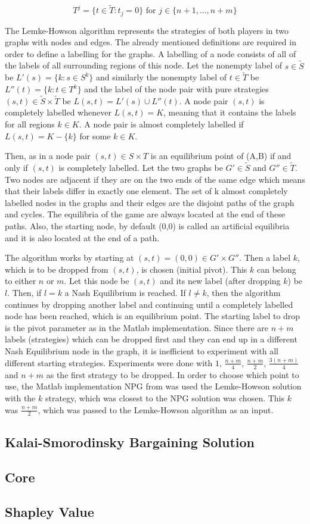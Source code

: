 \[
T^j = \{ t \in \tilde{T}: t_j = 0 \} \text{ for } j \in \{n+1,...,n+m\} 
\]

The Lemke-Howson algorithm represents the strategies of both players in two graphs with nodes and edges. The already mentioned definitions are required in order to define a labelling for the graphs. A labelling of a node consists of all of the labels of all surrounding regions of this node. Let the nonempty label of $s \in \tilde{S}$ be $L'(s) = \{ k: s \in S^k \}$ and similarly the nonempty label of $t \in \tilde{T}$ be $L''(t) = \{ k: t \in T^k \}$ and the label of the node pair with pure strategies $(s,t) \in \tilde{S} \times \tilde{T}$ be $L(s,t) = L'(s) \cup L''(t)$. A node pair $(s,t)$ is completely labelled whenever $L(s,t) = K$, meaning that it contains the labels for all regions $k \in K$. A node pair is almost completely labelled if $L(s,t) = K - \{k\}$ for some $k \in K$. 

Then, as in \citet{shapley1974note} a node pair $(s,t) \in S \times T$ is an equilibrium point of (A,B) if and only if $(s,t)$ is completely labelled. Let the two graphs be $G' \in \tilde{S}$ and $G'' \in \tilde{T}$. Two nodes are adjacent if they are on the two ends of the same edge which means that their labels differ in exactly one element. The set of k almost completely labelled nodes in the graphs and their edges are the disjoint paths of the graph and cycles. The equilibria of the game are always located at the end of these paths. Also, the starting node, by default (0,0) is called an artificial equilibria and it is also located at the end of a path.

The algorithm works by starting at $(s,t) = (0,0) \in G' \times G'' $. Then a label $k$, which is to be dropped from $(s,t)$, is chosen (initial pivot). This $k$ can belong to either $n$ or $m$. Let this node be $(s,t)$ and its new label (after dropping $k$) be $l$. Then, if $l=k$ a Nash Equilibrium is reached. If $l\neq k$, then the algorithm continues by dropping another label and continuing until a completely labelled node has been reached, which is an equilibrium point. The starting label to drop is the pivot parameter as in the Matlab implementation. Since there are $n+m$ labels (strategies) which can be dropped first and they can end up in a different Nash Equilibrium node in the graph, it is inefficient to experiment with all different starting strategies. Experiments were done with $1$, $\frac{n+m}{4}$, $\frac{n+m}{2}$, $\frac{3(n+m)}{4}$ and $n+m$ as the first strategy to be dropped. In order to choose which point to use, the Matlab implementation NPG from \citet{npg} was used the Lemke-Howson solution with the $k$ strategy, which was closest to the NPG solution was chosen. This $k$ was $\frac{n+m}{2}$, which was passed to the Lemke-Howson algorithm as an input.

\subsection{Kalai-Smorodinsky Bargaining Solution}

\subsection{Core}

\subsection{Shapley Value}


